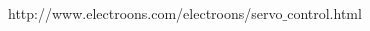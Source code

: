 \begin{thebibliography}{9}

 http://www.electroons.com/electroons/servo$\_$control.html

\end{thebibliography}